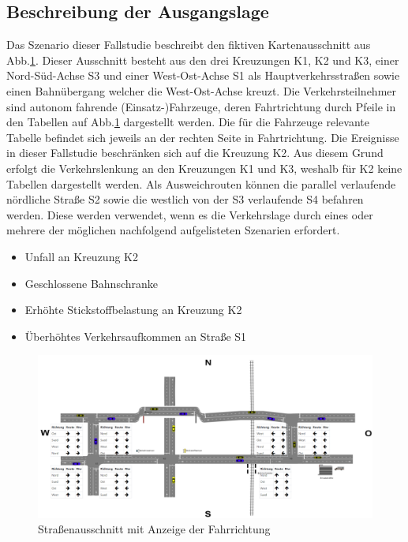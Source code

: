 \subsection{Beschreibung der Ausgangslage}
Das Szenario dieser Fallstudie beschreibt den fiktiven Kartenausschnitt aus Abb.\ref{fig2}. Dieser Ausschnitt besteht aus den drei Kreuzungen K1, K2 und K3, einer Nord-Süd-Achse S3 und einer West-Ost-Achse S1 als Hauptverkehrsstraßen sowie einen Bahnübergang welcher die West-Ost-Achse kreuzt. Die Verkehrsteilnehmer sind autonom fahrende (Einsatz-)Fahrzeuge, deren Fahrtrichtung durch Pfeile in den Tabellen auf Abb.\ref{fig2} dargestellt werden. Die für die Fahrzeuge relevante Tabelle befindet sich jeweils an der rechten Seite in Fahrtrichtung. Die Ereignisse in dieser Fallstudie beschränken sich auf die Kreuzung K2. Aus diesem Grund erfolgt die Verkehrslenkung an den Kreuzungen K1 und K3, weshalb für K2 keine Tabellen dargestellt werden. Als Ausweichrouten können die parallel verlaufende nördliche Straße S2 sowie die westlich von der S3 verlaufende S4 befahren werden. Diese werden verwendet, wenn es die Verkehrslage durch eines oder mehrere der möglichen nachfolgend aufgelisteten Szenarien erfordert.

\begin{itemize} 
\item Unfall an Kreuzung K2
\item Geschlossene Bahnschranke
\item Erhöhte Stickstoffbelastung an Kreuzung K2
\item Überhöhtes Verkehrsaufkommen an Straße S1
\end{itemize}

\begin{figure}[ht]
	\includegraphics[width=\textwidth]{images/dataanalyticswebapp.png}
	\caption{Straßenausschnitt mit Anzeige der Fahrrichtung}
	\label{fig2}
\end{figure}

